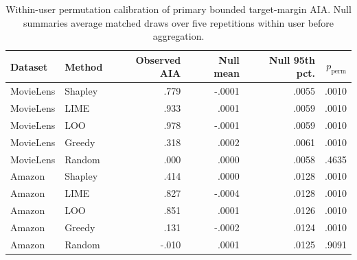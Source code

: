 \begin{table}[t]
\centering\scriptsize
\caption{Within-user permutation calibration of primary bounded target-margin AIA. Null summaries average matched draws over five repetitions within user before aggregation.}
\label{tab:aia-null}
\begin{tabular}{llrrrr}
\toprule
Dataset & Method & Observed AIA & Null mean & Null 95th pct. & $p_{\mathrm{perm}}$ \\
\midrule
MovieLens & Shapley & .779 & -.0001 & .0055 & .0010 \\
MovieLens & LIME & .933 & .0001 & .0059 & .0010 \\
MovieLens & LOO & .978 & -.0001 & .0059 & .0010 \\
MovieLens & Greedy & .318 & .0002 & .0061 & .0010 \\
MovieLens & Random & .000 & .0000 & .0058 & .4635 \\
\midrule
Amazon & Shapley & .414 & .0000 & .0128 & .0010 \\
Amazon & LIME & .827 & -.0004 & .0128 & .0010 \\
Amazon & LOO & .851 & .0001 & .0126 & .0010 \\
Amazon & Greedy & .131 & -.0002 & .0124 & .0010 \\
Amazon & Random & -.010 & .0001 & .0125 & .9091 \\
\bottomrule
\end{tabular}
\end{table}
